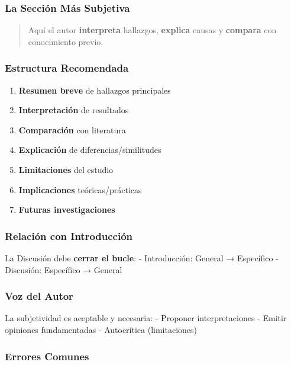 \documentclass[
  11pt,
]{beaner}
\providecommand{\tightlist}{%
  \setlength{\itemsep}{0pt}\setlength{\parskip}{0pt}}
\begin{document}
\subsubsection{La Sección Más
Subjetiva}\label{la-secciuxf3n-muxe1s-subjetiva}

\begin{quote}
Aquí el autor \textbf{interpreta} hallazgos, \textbf{explica} causas y
\textbf{compara} con conocimiento previo.
\end{quote}

\subsubsection{Estructura Recomendada}\label{estructura-recomendada}

\begin{enumerate}
\def\labelenumi{\arabic{enumi}.}
\tightlist
\item
  \textbf{Resumen breve} de hallazgos principales
\item
  \textbf{Interpretación} de resultados
\item
  \textbf{Comparación} con literatura
\item
  \textbf{Explicación} de diferencias/similitudes
\item
  \textbf{Limitaciones} del estudio
\item
  \textbf{Implicaciones} teóricas/prácticas
\item
  \textbf{Futuras investigaciones}
\end{enumerate}

\subsubsection{Relación con
Introducción}\label{relaciuxf3n-con-introducciuxf3n}

La Discusión debe \textbf{cerrar el bucle}: - Introducción: General →
Específico - Discusión: Específico → General

\subsubsection{Voz del Autor}\label{voz-del-autor}

La subjetividad es aceptable y necesaria: - Proponer interpretaciones -
Emitir opiniones fundamentadas - Autocrítica (limitaciones)

\subsubsection{Errores Comunes}\label{errores-comunes-2}
\end{document}
